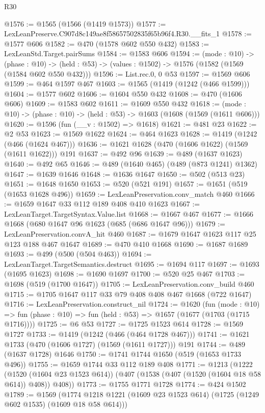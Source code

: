 \begin{lexlean}{R30}
\begin{coremodule}
@1576 := @1565 (@1566 (@1419 @1573))
@1577 := LexLeanPreserve.C907d8c149ae8f58657502835f65b96f4.R30.__fits_1
@1578 := @1577 @606
@1582 := @470 (@1578 @602 @550 @432)
@1583 := LexLeanStd.Target.pairSums
@1584 := @1583 @606
@1594 := (mode : @10) ->
  (phase : @10) -> (held : @53) -> (values : @1502) -> @1576 (@1582 (@1569 (@1584 @602 @550 @432)))
@1596 := List.rec.{0, 0} @53
@1597 := @1569 @606
@1599 := @464 @1597 @467
@1603 := @1565 (@1419 (@1242 (@466 @1599)))
@1604 := @1577 @602
@1606 := @1604 @550 @432
@1608 := @470 (@1606 @606)
@1609 := @1583 @602
@1611 := @1609 @550 @432
@1618 := (mode : @10) -> (phase : @10) -> (held : @53) -> @1603 (@1608 (@1569 (@1611 @606)))
@1620 := @1596 (fun (__v : @1502) => @1618)
@1621 := @481 @23
@1622 := @2 @53
@1623 := @1569 @1622
@1624 := @464 @1623
@1628 := @1419 (@1242 (@466 (@1624 @467)))
@1636 := @1621 @1628 (@470 (@1606 @1622) (@1569 (@1611 @1622))) @191
@1637 := @492 @96
@1639 := @489 (@1637 @1623)
@1640 := @492 @65
@1646 := @489 (@1640 @465) (@489 (@873 @1241) @1362)
@1647 := @1639 @1646
@1648 := @1636 @1647
@1650 := @502 (@513 @23)
@1651 := @1648 @1650
@1653 := @520 (@521 @191)
@1657 := @1651 (@519 (@1653 @1628 @496))
@1659 := LexLeanPreservation.conv_match @460
@1666 := @1659 @1647 @33 @112 @189 @408 @410 @1623
@1667 := LexLeanTarget.TargetSyntax.Value.list
@1668 := @1667 @467
@1677 := @1666 @1668 (@680 @1647 @96 @1623 (@685 (@686 @1647 @96)))
@1679 := LexLeanPreservation.convA_hit @460
@1687 := @1679 @1647 @1623 @117 @25 @123 @188 @467 @1647
@1689 := @470 @410 @1668
@1690 := @1687 @1689
@1693 := @499 (@500 (@504 @463))
@1694 := LexLeanTarget.TargetSemantics.destruct
@1695 := @1694 @117
@1697 := @1693 (@1695 @1623)
@1698 := @1690 @1697
@1700 := @520 @25 @467
@1703 := @1698 (@519 (@1700 @1647))
@1705 := LexLeanPreservation.conv_build @460
@1715 := @1705 @1647 @117 @33 @79 @408 @408 @467 @1668 (@722 @1647)
@1716 := LexLeanPreservation.construct_nil
@1724 := @1620
    (fun (mode : @10) =>
    fun (phase : @10) => fun (held : @53) => @1657 (@1677 (@1703 (@1715 @1716))))
@1725 := @6 @53
@1727 := @1725 @1523 @614
@1728 := @1569 @1727
@1733 := @1419 (@1242 (@466 (@464 @1728 @467)))
@1741 := @1621 @1733 (@470 (@1606 @1727) (@1569 (@1611 @1727))) @191
@1744 := @489 (@1637 @1728) @1646
@1750 := @1741 @1744 @1650 (@519 (@1653 @1733 @496))
@1755 := @1659 @1744 @33 @112 @189 @408
@1771 := @1213
    (@1222
      (@1520 (@1604 @23 @1523 @614))
      (@407 (@1538 (@407 (@1520 (@1604 @18 @58 @614)) @408)) @408))
@1773 := @1755 @1771 @1728
@1774 := @424 @1502
@1789 := @1569
    (@1774 @1218 @1221 (@1609 @23 @1523 @614) (@1725 (@1249 @602 @1535) (@1609 @18 @58 @614)))

\end{coremodule}
\end{lexlean}
